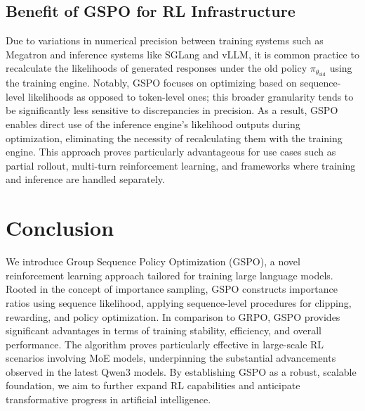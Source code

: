 \subsection{Benefit of GSPO for RL Infrastructure}

Due to variations in numerical precision between training systems such as Megatron and inference systems like SGLang and vLLM, it is common practice to recalculate the likelihoods of generated responses under the old policy $\pi_{\theta_\text{old}}$ using the training engine. Notably, GSPO focuses on optimizing based on sequence-level likelihoods as opposed to token-level ones; this broader granularity tends to be significantly less sensitive to discrepancies in precision. As a result, GSPO enables direct use of the inference engine’s likelihood outputs during optimization, eliminating the necessity of recalculating them with the training engine. This approach proves particularly advantageous for use cases such as partial rollout, multi-turn reinforcement learning, and frameworks where training and inference are handled separately.

\section{Conclusion}

We introduce Group Sequence Policy Optimization (GSPO), a novel reinforcement learning approach tailored for training large language models. Rooted in the concept of importance sampling, GSPO constructs importance ratios using sequence likelihood, applying sequence-level procedures for clipping, rewarding, and policy optimization. In comparison to GRPO, GSPO provides significant advantages in terms of training stability, efficiency, and overall performance. The algorithm proves particularly effective in large-scale RL scenarios involving MoE models, underpinning the substantial advancements observed in the latest Qwen3 models. By establishing GSPO as a robust, scalable foundation, we aim to further expand RL capabilities and anticipate transformative progress in artificial intelligence.

